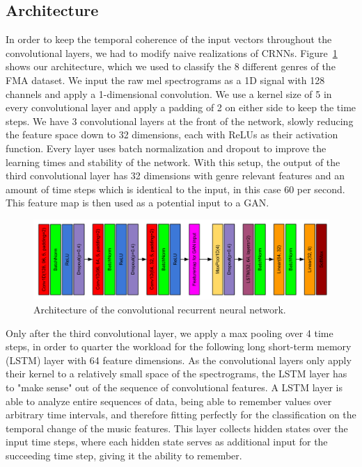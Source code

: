     \subsection{Architecture}
    In order to keep the temporal coherence of the input vectors throughout the convolutional layers, we had to modify naive realizations of CRNNs.
    Figure~\ref{CRNN} shows our architecture, which we used to classify the 8 different genres of the FMA dataset.
    We input the raw mel spectrograms as a 1D signal with 128 channels and apply a 1-dimensional convolution.
    We use a kernel size of 5 in every convolutional layer and apply a padding of 2 on either side to keep the time steps.
    We have 3 convolutional layers at the front of the network, slowly reducing the feature space down to 32 dimensions, each with ReLUs as their activation function.
    Every layer uses batch normalization and dropout to improve the learning times and stability of the network.
    With this setup, the output of the third convolutional layer has 32 dimensions with genre relevant features and an amount of time steps which is identical to the input, in this case 60 per second.
    This feature map is then used as a potential input to a GAN.\\
    \begin{figure}[t]
        \centering
        \includegraphics[width=\textwidth]{images/CRNNmodel}
        \caption{Architecture of the convolutional recurrent neural network.}
        \label{CRNN}
    \end{figure}
    Only after the third convolutional layer, we apply a max pooling over 4 time steps, in order to quarter the workload for the following long short-term memory (LSTM) layer with 64 feature dimensions.
    As the convolutional layers only apply their kernel to a relatively small space of the spectrograms, the LSTM layer has to "make sense" out of the sequence of convolutional features.
    A LSTM layer is able to analyze entire sequences of data, being able to remember values over arbitrary time intervals, and therefore fitting perfectly for the classification on the temporal change of the music features.
    This layer collects hidden states over the input time steps, where each hidden state serves as additional input for the succeeding time step, giving it the ability to remember.
